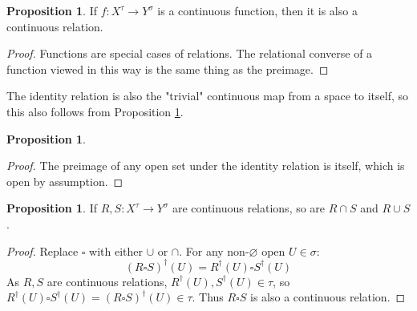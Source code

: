 \documentclass{tufte-handout}
\theoremstyle{definition}
\newtheorem{proposition}[theorem]{Proposition}
\newtheorem{rem}[theorem]{Reminder}
\begin{document}
\begin{proposition}\label{prop:func}
If $f: X^\tau \rightarrow Y^\sigma$ is a continuous function, then it is also a continuous relation.
\begin{proof}
Functions are special cases of relations. The relational converse of a function viewed in this way is the same thing as the preimage.
\end{proof}
\end{proposition}

The identity relation is also the "trivial" continuous map from a space to itself, so this also follows from Proposition \ref{prop:func}.
\begin{proposition}\label{prop:idrel}
\begin{proof}
The preimage of any open set under the identity relation is itself, which is open by assumption.
\end{proof}
\end{proposition}


\begin{proposition}
If $R,S: X^\tau \rightarrow Y^\sigma$ are continuous relations, so are $R \cap S$ and $R \cup S$.
\begin{proof}
Replace $\square$ with either $\cup$ or $\cap$. For any non-$\varnothing$ open $U \in \sigma$: \[(R \square S)^\dag (U) = R^\dag(U) \square S^\dag(U)\] As $R,S$ are continuous relations, $R^\dag(U),S^\dag(U) \in \tau$, so $R^\dag(U) \square S^\dag(U) = (R \square S)^\dag (U) \in \tau$. Thus $R\square S$ is also a continuous relation.
\end{proof}
\end{proposition}
\end{document}
